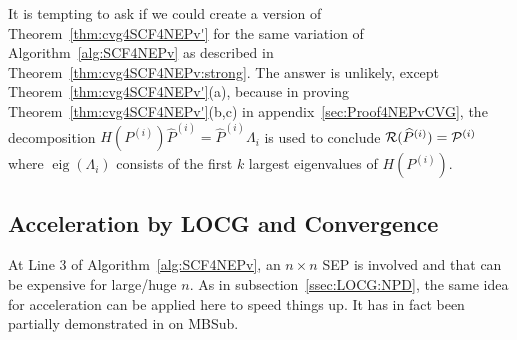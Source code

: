 \documentclass[11pt]{article}
\def\cP{{\cal P}}
\def\cR{{\cal R}}
\def\what{\widehat}
\DeclareMathOperator{\eig}{eig}
\DeclareMathOperator{\tr}{tr}
\DeclareMathOperator{\T}{T}
\def\Red{\textcolor{red}}
\theoremstyle{definition}
\numberwithin{equation}{section}
\begin{document}
It is tempting to ask if we could create a version of Theorem~\ref{thm:cvg4SCF4NEPv'} for the same
variation of Algorithm~\ref{alg:SCF4NEPv} as described in Theorem~\ref{thm:cvg4SCF4NEPv:strong}.
The answer is unlikely, except Theorem~\ref{thm:cvg4SCF4NEPv'}(a), because in proving
Theorem~\ref{thm:cvg4SCF4NEPv'}(b,c) in appendix~\ref{sec:Proof4NEPvCVG}, the decomposition
$H(P^{(i)})\what P^{(i)}=\what P^{(i)}\Lambda_i$ is used to conclude $\cR(\what P^{(i)})=\cP^{(i)}$
where $\eig(\Lambda_i)$ consists of the first $k$ largest eigenvalues of $H(P^{(i)})$.

%

\subsection{Acceleration by LOCG and Convergence}\label{ssec:LOCG:NEPv}
At Line 3 of Algorithm~\ref{alg:SCF4NEPv}, an $n\times n$ SEP is involved and that can be expensive for large/huge $n$.
As in subsection~\ref{ssec:LOCG:NPD}, the same idea for acceleration can be applied here to
speed things up. It has in fact been partially demonstrated in \cite[section 5]{wazl:2022a} on
MBSub.
\end{document}
